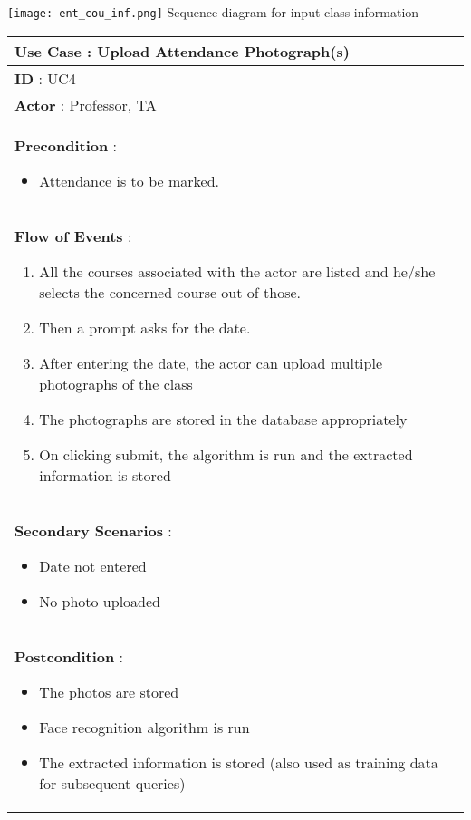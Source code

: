 \documentclass[paper=a4, fontsize=15pt]{scrartcl}
\begin{document}
 
 \begin{center}
\texttt{[image: ent\_cou\_inf.png]}
 {\Large Sequence diagram for input class information}
\end{center}


 
 
 \begin{tabular}{|p{36em}|} 
 \hline
 \textbf{Use Case : Upload Attendance Photograph(s)}\\
 \hline
 \textbf{ID } : UC4\\
 \hline
 \textbf{Actor }: Professor, TA\\
 \hline
 \textbf{Precondition }:
 \begin{itemize}[topsep=0pt]
     \item Attendance is to be marked.
 \end{itemize}\\
 \hline
 \textbf{Flow of Events }:
 \begin{enumerate}[topsep=0pt]
     \item All the courses associated with the actor are listed and he/she selects the concerned course out of those.
     \item Then a prompt asks for the date.
     \item After entering the date, the actor can upload multiple photographs of the class
     \item The photographs are stored in the database appropriately
     \item On clicking submit, the algorithm is run and the extracted information is stored
 \end{enumerate}\\
 \hline
 \textbf{Secondary Scenarios }:
 \begin{itemize}[topsep=0pt]
     \item Date not entered
     \item No photo uploaded     
 \end{itemize}\\
 \hline 
 \textbf{Postcondition }:
 \begin{itemize}[topsep=0pt]
     \item The photos are stored
     \item Face recognition algorithm is run
     \item The extracted information is stored (also used as training data for subsequent queries)
 \end{itemize}\\
 \hline
 
 
 \end{tabular}
 
\end{document}

